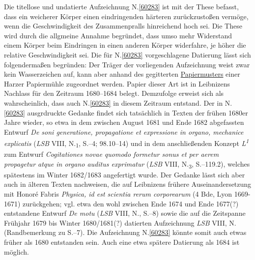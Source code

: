 \begin{ledgroup}%
\footnotesize%
\pstart%
\noindent%
%
Die titellose und undatierte Aufzeichnung N.\;\ref{60283} ist mit der These befasst, dass ein weicherer Körper einen eindringenden härteren zurückzustoßen vermöge, wenn die Geschwindigkeit des Zusammenpralls hinreichend hoch sei.
Die These wird durch die allgmeine Annahme begründet, dass umso mehr Widerstand einem Körper beim Eindringen in einen anderen Körper widerfahre, je höher die relative Geschwindigkeit sei.
Die für N.\;\ref{60283} vorgeschlagene Datierung lässt sich folgendermaßen begründen:
\pend%
\pstart%
Der Träger der vorliegenden Aufzeichnung weist zwar kein Wasserzeichen auf, kann aber anhand des gegitterten \href{\Scan{LH_37_05_025wz}}{Papiermusters} einer Harzer Papiermühle zugeordnet werden. %
Papier dieser Art ist in Leibnizens Nachlass für den Zeitraum 1680--1684 belegt.
Demzufolge erweist sich als wahrscheinlich, dass auch N.\;\ref{60283} in diesem Zeitraum entstand.
Der in N.\;\ref{60283} ausgrdruckte Gedanke findet sich tatsächlich in Texten der frühen 1680er Jahre wieder, so etwa in dem zwischen August 1681 und Ende 1682 abgefassten Entwurf \textit{De soni generatione, propagatione et expressione in organo, mechanice explicatis} (\textit{LSB} VIII, N.\textsubscript{1}, S.--4; 98.10--14)\cite{02527} und in dem anschließenden Konzept \textit{L\textsuperscript{1}} zum Entwurf \textit{Cogitationes novae quomodo formetur sonus et per aerem propagetur atque in organo auditus exprimatur} (\textit{LSB} VIII, N.\textsubscript{3}, S.--119.2),\cite{02529} welches spätestens im Winter 1682/1683 angefertigt wurde.
Der Gedanke lässt sich aber auch in älteren Texten nachweisen, die auf Leibnizens frühere Auseinandersetzung mit Honoré Fabris \textit{Physica, id est scientia rerum corporearum} (4 Bde, Lyon 1669-1671)\cite{00044} zurückgehen; vgl. etwa den wohl zwischen Ende 1674 und Ende 1677\;(?) entstandene Entwurf \textit{De motu} (\textit{LSB} VIII, N., S.--8)\cite{02598} sowie die auf die Zeitspanne Frühjahr 1679 bis Winter 1680/1681\;(?) datierten Aufzeichnung \textit{LSB} VIII, N. (Randbemerkung zu S.--7).\cite{02599}
Die Aufzeichnung N.\;\ref{60283} könnte somit auch etwas früher als 1680 entstanden sein. 
Auch eine etwa spätere Datierung als 1684 ist möglich.
\pend%
\end{ledgroup}%
%
\frenchspacing%
\normalsize%
\newpage%
